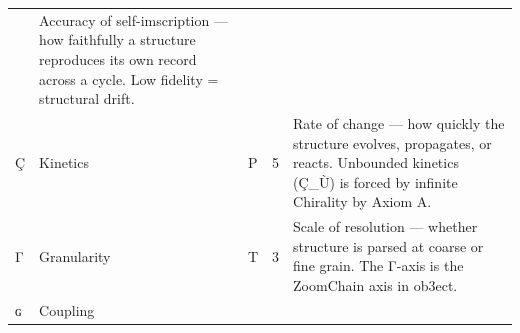 \begin{longtable}[]{@{}lllll@{}}
\begin{minipage}[t]{0.16\columnwidth}
\end{minipage} & \begin{minipage}[t]{0.27\columnwidth}\raggedright
Accuracy of self-imscription --- how faithfully a structure reproduces
its own record across a cycle. Low fidelity = structural drift.\strut
\end{minipage}\tabularnewline
\begin{minipage}[t]{0.14\columnwidth}\raggedright
Ç\strut
\end{minipage} & \begin{minipage}[t]{0.12\columnwidth}\raggedright
Kinetics\strut
\end{minipage} & \begin{minipage}[t]{0.16\columnwidth}\raggedright
P\strut
\end{minipage} & \begin{minipage}[t]{0.16\columnwidth}\raggedright
5\strut
\end{minipage} & \begin{minipage}[t]{0.27\columnwidth}\raggedright
Rate of change --- how quickly the structure evolves, propagates, or
reacts. Unbounded kinetics (Ç\_Ù) is forced by infinite Chirality by
Axiom A.\strut
\end{minipage}\tabularnewline
\begin{minipage}[t]{0.14\columnwidth}\raggedright
Γ\strut
\end{minipage} & \begin{minipage}[t]{0.12\columnwidth}\raggedright
Granularity\strut
\end{minipage} & \begin{minipage}[t]{0.16\columnwidth}\raggedright
T\strut
\end{minipage} & \begin{minipage}[t]{0.16\columnwidth}\raggedright
3\strut
\end{minipage} & \begin{minipage}[t]{0.27\columnwidth}\raggedright
Scale of resolution --- whether structure is parsed at coarse or fine
grain. The Γ-axis is the ZoomChain axis in ob3ect.\strut
\end{minipage}\tabularnewline
\begin{minipage}[t]{0.14\columnwidth}\raggedright
ɢ\strut
\end{minipage} & \begin{minipage}[t]{0.12\columnwidth}\raggedright
Coupling\strut
\end{minipage} & \begin{minipage}[t]{0.16\columnwidth}\raggedright

\end{minipage}
\end{longtable}
